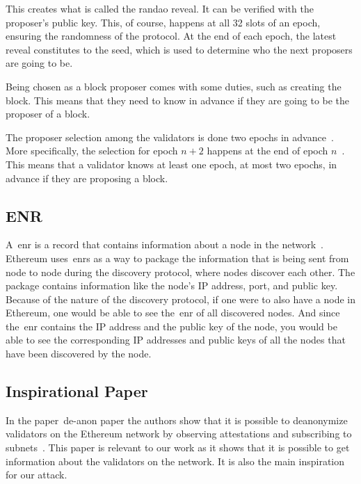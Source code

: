 This creates what is called the \gls{randao} reveal.
It can be verified with the proposer's public key.
This, of course, happens at all 32 slots of an epoch, ensuring the randomness of the protocol.
At the end of each epoch, the latest reveal constitutes to the seed, which is used to determine who the next proposers are going to be.


Being chosen as a block proposer comes with some duties, such as creating the block.
This means that they need to know in advance if they are going to be the proposer of a block.

The proposer selection among the validators is done two epochs in advance~\cite{random-selection}.
More specifically, the selection for epoch $n+2$ happens at the end of epoch $n$~\cite{upgrading-ethereum-randomness}.
This means that a validator knows at least one epoch, at most two epochs, in advance if they are proposing a block.


\subsection{ENR}\label{subsec:enr}
A~\gls{enr} is a record that contains information about a node in the network~\cite{EIP-778:Ethereum-Node-Records}.
Ethereum uses~\glspl{enr} as a way
to package the information that is being sent from node to node during the discovery protocol,
where nodes discover each other.
The package contains information like the node's IP address, port, and public key.
Because of the nature of the discovery protocol, if one were to also have a node in Ethereum,
one would be able to see the~\gls{enr} of all discovered nodes.
And since the~\gls{enr} contains the IP address and the public key of the node,
you would be able
to see the corresponding IP addresses and public keys of all the nodes that have been discovered by the node.


\subsection{Inspirational Paper}\label{subsec:inspirational-papers}

In the paper~\gls{de-anon paper} the authors show that it is possible to deanonymize validators on the Ethereum network by observing attestations and subscribing to subnets~\cite{heimbach2024deanonymizingethereumvalidatorsp2p}.
This paper is relevant to our work as it shows that it is possible to get information about the validators on the network.
It is also the main inspiration for our attack.

